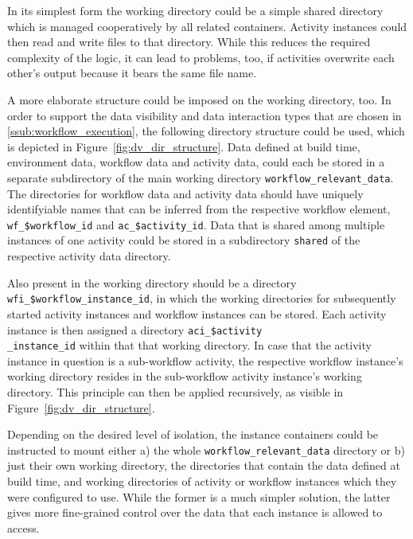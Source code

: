 
    In its simplest form the working directory could be a simple shared directory which is managed cooperatively by all related containers. Activity instances could then read and write files to that directory. While this reduces the required complexity of the logic, it can lead to problems, too, \eg if activities overwrite each other's output because it bears the same file name.

    A more elaborate structure could be imposed on the working directory, too. In order to support the data visibility and data interaction types that are chosen in \ref{ssub:workflow_execution}, the following directory structure could be used, which is depicted in Figure~\ref{fig:dv_dir_structure}.
    Data defined at build time, \ie environment data, workflow data and activity data, could each be stored in a separate subdirectory of the main working directory \texttt{workflow\_relevant\_data}. The directories for workflow data and activity data should have uniquely identifyiable names that can be inferred from the respective workflow element, \eg \texttt{wf\_\$workflow\_id} and \texttt{ac\_\$activity\_id}. Data that is shared among multiple instances of one activity could be stored in a subdirectory \texttt{shared} of the respective activity data directory.

    Also present in the working directory should be a directory \texttt{wfi\_\$workflow\_instance\_id}, in which the working directories for subsequently started activity instances and workflow instances can be stored. Each activity instance is then assigned a directory \texttt{aci\_\$activity\\\_instance\_id} within that that working directory. In case that the activity instance in question is a sub-workflow activity, the respective workflow instance's working directory resides in the sub-workflow activity instance's working directory. This principle can then be applied recursively, as visible in Figure~\ref{fig:dv_dir_structure}.

    Depending on the desired level of isolation, the instance containers could be instructed to mount either a) the whole \texttt{workflow\_relevant\_data} directory or b) just their own working directory, the directories that contain the data defined at build time, and working directories of activity or workflow instances which they were configured to use. While the former is a much simpler solution, the latter gives more fine-grained control over the data that each instance is allowed to access.

